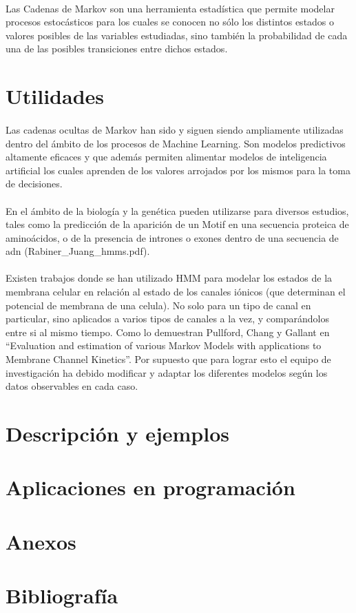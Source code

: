 \documentclass[11pt,a4paper]{article}
\begin{document}
\paragraph{}
Las Cadenas de Markov son una herramienta estadística que permite modelar procesos estocásticos para los cuales se conocen no sólo los distintos estados o valores posibles de las variables estudiadas, sino también la probabilidad de cada una de las posibles transiciones entre dichos estados.


\section{Utilidades}
\paragraph{}
Las cadenas ocultas de Markov han sido y siguen siendo ampliamente utilizadas dentro del ámbito de los procesos de Machine Learning.
Son modelos predictivos altamente eficaces y que además permiten alimentar modelos de inteligencia artificial los cuales aprenden de los valores arrojados por los mismos para la toma de decisiones.

\paragraph{}
En el ámbito de la biología y la genética pueden utilizarse para diversos estudios, tales como la predicción de la aparición de un Motif en una secuencia proteica de aminoácidos, o de la presencia de intrones o exones dentro de una secuencia de adn (Rabiner_Juang_hmms.pdf).

\paragraph{}
Existen trabajos donde se han utilizado HMM para modelar los estados de la membrana celular en relación al estado de los canales iónicos (que determinan el potencial de membrana de una celula). No solo para un tipo de canal en particular, sino aplicados a varios tipos de canales a la vez, y comparándolos entre si al mismo tiempo. Como lo demuestran Pullford, Chang y Gallant en “Evaluation and estimation of various Markov Models with applications to Membrane Channel Kinetics”.
Por supuesto que para lograr esto el equipo de investigación ha debido modificar y adaptar los diferentes modelos según los datos observables en cada caso.

\section{Descripción y ejemplos}
\section{Aplicaciones en programación}
\section{Anexos}
\section{Bibliografía}


\end{document}
